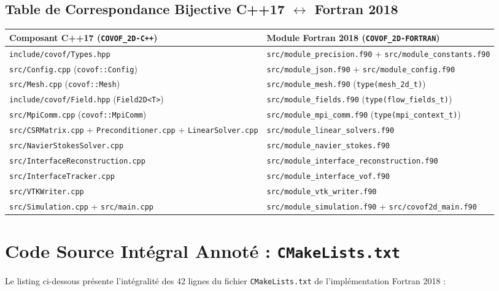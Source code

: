 \documentclass[10pt,a4paper,oneside]{book}
\begin{document}
\subsection{Table de Correspondance Bijective C++17 $\leftrightarrow$ Fortran 2018}
\begin{center}
\begin{tabular}{ll}
\hline
\textbf{Composant C++17 (\texttt{COVOF\_2D-C++})} & \textbf{Module Fortran 2018 (\texttt{COVOF\_2D-FORTRAN})} \\
\hline
\texttt{include/covof/Types.hpp} & \texttt{src/module\_precision.f90} + \texttt{src/module\_constants.f90} \\
\texttt{src/Config.cpp} (\texttt{covof::Config}) & \texttt{src/module\_json.f90} + \texttt{src/module\_config.f90} \\
\texttt{src/Mesh.cpp} (\texttt{covof::Mesh}) & \texttt{src/module\_mesh.f90} (\texttt{type(mesh\_2d\_t)}) \\
\texttt{include/covof/Field.hpp} (\texttt{Field2D<T>}) & \texttt{src/module\_fields.f90} (\texttt{type(flow\_fields\_t)}) \\
\texttt{src/MpiComm.cpp} (\texttt{covof::MpiComm}) & \texttt{src/module\_mpi\_comm.f90} (\texttt{type(mpi\_context\_t)}) \\
\texttt{src/CSRMatrix.cpp} + \texttt{Preconditioner.cpp} + \texttt{LinearSolver.cpp} & \texttt{src/module\_linear\_solvers.f90} \\
\texttt{src/NavierStokesSolver.cpp} & \texttt{src/module\_navier\_stokes.f90} \\
\texttt{src/InterfaceReconstruction.cpp} & \texttt{src/module\_interface\_reconstruction.f90} \\
\texttt{src/InterfaceTracker.cpp} & \texttt{src/module\_interface\_vof.f90} \\
\texttt{src/VTKWriter.cpp} & \texttt{src/module\_vtk\_writer.f90} \\
\texttt{src/Simulation.cpp} + \texttt{src/main.cpp} & \texttt{src/module\_simulation.f90} + \texttt{src/covof2d\_main.f90} \\
\hline
\end{tabular}
\end{center}

\section{Code Source Intégral Annoté : \texttt{CMakeLists.txt}}
Le listing ci-dessous présente l'intégralité des 42 lignes du fichier \texttt{CMakeLists.txt} de l'implémentation Fortran 2018 :
\end{document}
